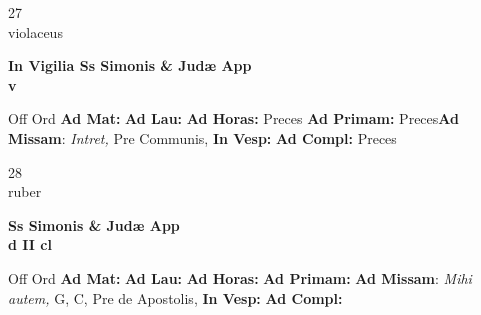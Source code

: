 \documentclass[10pt, openany]{book}
\begin{document}
    \begin{center}
        \begin{minipage}{3.5in}
            \vspace{2em}
            \begin{minipage}{0.5in}
                {\Huge 27} \\
                {\normalsize violaceus}
            \end{minipage}
            \begin{minipage}{3.0in}
                \textbf{ \large In Vigilia Ss Simonis \& Judæ App \\
                \textnormal{\normalsize v}}

            \end{minipage}
            \begin{justify}Off Ord
                \textbf{Ad Mat: }
                \textbf{Ad Lau: }
                \textbf{Ad Horas: }Preces
                \textbf{Ad Primam: }Preces\textbf{Ad Missam}: \textit{Intret,} Pre Communis, 
                \textbf{In Vesp: }
                \textbf{Ad Compl: }Preces
            \end{justify}
        \end{minipage}
    \end{center}

    \begin{center}
        \begin{minipage}{3.5in}
            \vspace{2em}
            \begin{minipage}{0.5in}
                {\Huge 28} \\
                {\normalsize ruber}
            \end{minipage}
            \begin{minipage}{3.0in}
                \textbf{ \large Ss Simonis \& Judæ App \\
                \textnormal{\normalsize d II cl}}

            \end{minipage}
            \begin{justify}Off Ord
                \textbf{Ad Mat: }
                \textbf{Ad Lau: }
                \textbf{Ad Horas: }
                \textbf{Ad Primam: }\textbf{Ad Missam}: \textit{Mihi autem,} G, C, Pre de Apostolis, 
                \textbf{In Vesp: }
                \textbf{Ad Compl: }
            \end{justify}
        \end{minipage}
    \end{center}
\end{document}
